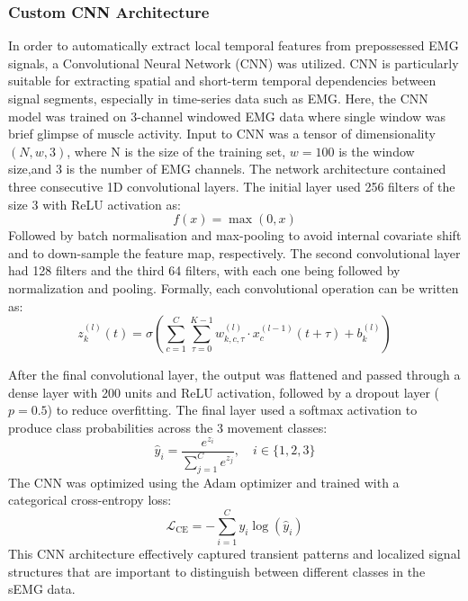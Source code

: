 \documentclass{elektr}
\begin{document}
\subsubsection{Custom CNN Architecture}
In order to automatically extract local temporal features from prepossessed EMG signals, a Convolutional Neural Network (CNN) was utilized. CNN is particularly suitable for extracting spatial and short-term temporal dependencies between signal segments, especially in time-series data such as EMG. Here, the CNN model was trained on 3-channel windowed EMG data where single window was brief glimpse of muscle activity. Input to CNN was a tensor of dimensionality $(N, w, 3)$, where N is the size of the training set, $w = 100$ is the window size,and 3 is the number of EMG channels.
The network architecture contained three consecutive 1D convolutional layers. The initial layer used 256 filters of the size 3 with ReLU activation as:
\begin{equation}
	f(x) = \max(0, x)
\end{equation}
Followed by batch normalisation and max-pooling to avoid internal covariate shift and to down-sample the feature map, respectively. The second convolutional layer had 128 filters and the third 64 filters, with each one being followed by normalization and pooling.
Formally, each convolutional operation can be written as:
\begin{equation}
	z^{(l)}_k(t) = \sigma\left( \sum_{c=1}^{C} \sum_{\tau=0}^{K-1} w^{(l)}_{k,c,\tau} \cdot x^{(l-1)}_c(t+\tau) + b^{(l)}_k \right)
\end{equation}

After the final convolutional layer, the output was flattened and passed through a dense layer with 200 units and ReLU activation, followed by a dropout layer ($p=0.5$) to reduce overfitting. The final layer used a softmax activation to produce class probabilities across the 3 movement classes:
\begin{equation}
	\hat{y}_i = \frac{e^{z_i}}{\sum_{j=1}^C e^{z_j}}, \quad i \in \{1, 2, 3\}
\end{equation}
The CNN was optimized using the Adam optimizer and trained with a categorical cross-entropy loss:
\begin{equation}
	\mathcal{L}_{\text{CE}} = -\sum_{i=1}^{C} y_i \log(\hat{y}_i)
\end{equation}
This CNN architecture effectively captured transient patterns and localized signal structures that are important to distinguish between different classes in the sEMG data.
\end{document}
